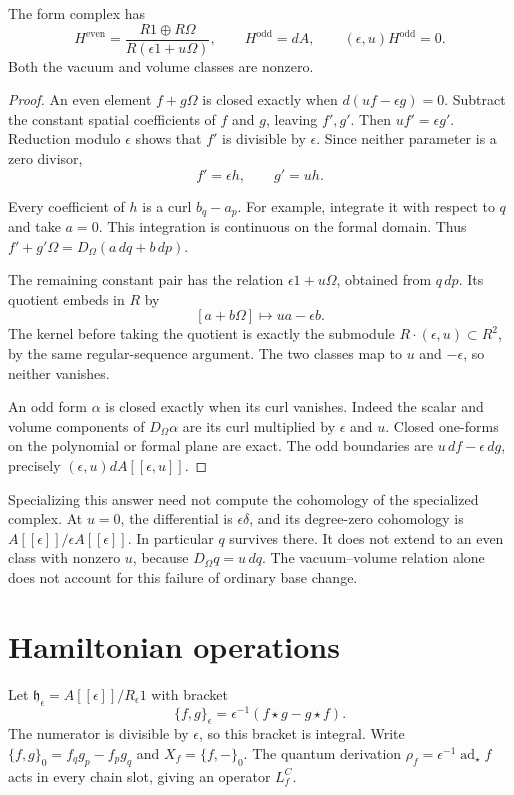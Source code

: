 \begin{proposition}\label{mht:prop:integral-form-cohomology}
The form complex has
\[
 H^{\mathrm{even}}
   =\frac{R1\oplus R\Omega}{R(\epsilon1+u\Omega)},
 \qquad H^{\mathrm{odd}}=dA,
 \qquad (\epsilon,u)H^{\mathrm{odd}}=0.
\]
Both the vacuum and volume classes are nonzero.
\end{proposition}
\begin{proof}
An even element $f+g\Omega$ is closed exactly when
$d(uf-\epsilon g)=0$.
Subtract the constant spatial coefficients of $f$ and $g$,
leaving $f',g'$. Then $uf'=\epsilon g'$.
Reduction modulo $\epsilon$ shows that $f'$ is divisible by
$\epsilon$. Since neither parameter is a zero divisor,
\[
 f'=\epsilon h,\qquad g'=uh.
\]

Every coefficient of $h$ is a curl $b_q-a_p$.
For example, integrate it with respect to $q$ and take $a=0$.
This integration is continuous on the formal domain.
Thus $f'+g'\Omega=D_\Omega(a\,dq+b\,dp)$.

The remaining constant pair has the relation
$\epsilon1+u\Omega$, obtained from $q\,dp$.
Its quotient embeds in $R$ by
\[
 [a+b\Omega]\longmapsto ua-\epsilon b.
\]
The kernel before taking the quotient is exactly the submodule
$R\cdot(\epsilon,u)\subset R^2$, by the same regular-sequence argument.
The two classes map to $u$ and $-\epsilon$, so neither vanishes.

An odd form $\alpha$ is closed exactly when its curl vanishes.
Indeed the scalar and volume components of $D_\Omega\alpha$
are its curl multiplied by $\epsilon$ and $u$.
Closed one-forms on the polynomial or formal plane are exact.
The odd boundaries are
$u\,df-\epsilon\,dg$, precisely
$(\epsilon,u)dA[[\epsilon,u]]$.
\end{proof}

Specializing this answer need not compute the cohomology of
the specialized complex. At $u=0$, the differential is
$\epsilon\delta$, and its degree-zero cohomology is
$A[[\epsilon]]/\epsilon A[[\epsilon]]$.
In particular $q$ survives there. It does not extend to an
even class with nonzero $u$, because $D_\Omega q=u\,dq$.
The vacuum--volume relation alone does not account for this
failure of ordinary base change.

\section{Hamiltonian operations}

Let $\mathfrak h_\epsilon=A[[\epsilon]]/R_\epsilon1$ with
bracket
\[
 \{f,g\}_\epsilon=\epsilon^{-1}(f\star g-g\star f).
\]
The numerator is divisible by $\epsilon$, so this bracket
is integral. Write $\{f,g\}_0=f_qg_p-f_pg_q$ and
$X_f=\{f,-\}_0$. The quantum derivation
$\rho_f=\epsilon^{-1}\operatorname{ad}_\star f$ acts in
every chain slot, giving an operator $L_f^C$.

